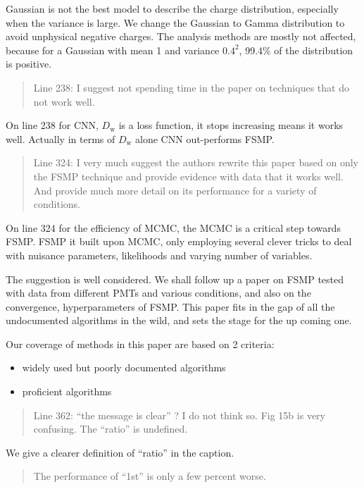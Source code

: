 \documentclass[12pt]{article}
\begin{document}
Gaussian is not the best model to describe the charge distribution, especially when the variance is large. We change the Gaussian to Gamma distribution to avoid unphysical negative charges. The analysis methods are mostly not affected, because for a Gaussian with mean 1 and variance $0.4^2$, 99.4\% of the distribution is positive.

\begin{quote}
Line 238: I suggest not spending time in the paper on techniques that do not work well.
\end{quote}

On line 238 for CNN, $D_\mathrm{w}$ is a loss function, it stops increasing means it works well.  Actually in terms of $D_\mathrm{w}$ alone CNN out-performs FSMP.

\begin{quote}
Line 324: I very much suggest the authors rewrite this paper based on only the FSMP technique and provide evidence with data that it works well. And provide much more detail on its performance for a variety of conditions.
\end{quote}

On line 324 for the efficiency of MCMC, the MCMC is a critical step towards FSMP.  FSMP it built upon MCMC, only employing several clever tricks to deal with nuisance parameters, likelihoods and varying number
of variables.

The suggestion is well considered.  We shall follow up a paper on FSMP tested with data from different PMTs and various conditions, and also on the convergence, hyperparameters of FSMP.  This paper fits in the gap of all the undocumented algorithms in the wild, and sets the stage for the up coming one.

Our coverage of methods in this paper are based on 2 criteria:

\begin{itemize}
    \item widely used but poorly documented algorithms
    \item proficient algorithms
\end{itemize}

\begin{quote}
Line 362: ``the message is clear'' ? I do not think so. Fig 15b is very confusing. The ``ratio'' is undefined. 
\end{quote}

We give a clearer definition of ``ratio'' in the caption.

\begin{quote}
The performance of ``1st'' is only a few percent worse. 
\end{quote}
\end{document}
